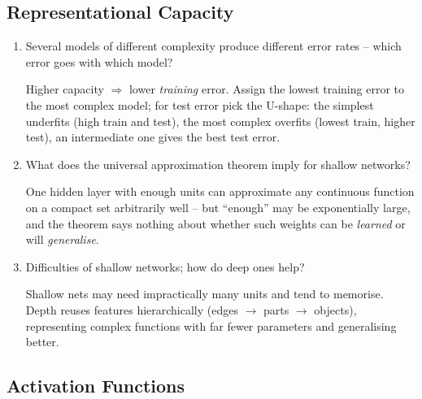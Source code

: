 \documentclass[10pt,a4paper]{article}
\newcommand{\q}[1]{\item #1}
\begin{document}
\subsection{Representational Capacity}

\begin{enumerate}[leftmargin=*,label=\textbf{Q\arabic*.}]

\q Several models of different complexity produce different error rates -- which error goes with which model?
\begin{answerbox}
Higher capacity $\Rightarrow$ lower \emph{training} error. Assign the lowest training error to the most complex model; for test error pick the U-shape: the simplest underfits (high train and test), the most complex overfits (lowest train, higher test), an intermediate one gives the best test error.
\end{answerbox}

\q What does the universal approximation theorem imply for shallow networks?
\begin{answerbox}
One hidden layer with enough units can approximate any continuous function on a compact set arbitrarily well -- but ``enough'' may be exponentially large, and the theorem says nothing about whether such weights can be \emph{learned} or will \emph{generalise}.
\end{answerbox}

\q Difficulties of shallow networks; how do deep ones help?
\begin{answerbox}
Shallow nets may need impractically many units and tend to memorise. Depth reuses features hierarchically (edges $\to$ parts $\to$ objects), representing complex functions with far fewer parameters and generalising better.
\end{answerbox}

\end{enumerate}

\subsection{Activation Functions}
\end{document}

